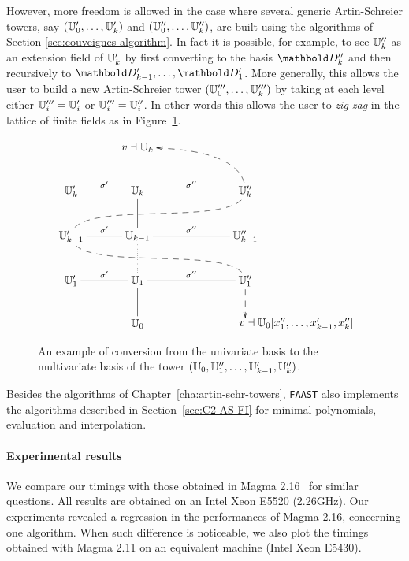   However, more freedom is allowed in the case where
several generic Artin-Schreier towers, say $(\mathbb{U}_0',\ldots,\mathbb{U}_k')$ and
$(\mathbb{U}_0'',\ldots,\mathbb{U}_k'')$, are built using the algorithms of Section
\ref{sec:couveignes-algorithm}. In fact it is possible, for example,
to see $\mathbb{U}_k''$ as an extension field of $\mathbb{U}'_k$ by first converting
to the basis $\basis{D}''_k$ and then recursively to
$\basis{D}'_{k-1},\ldots,\basis{D}'_1$. More generally, this allows
the user to build a new Artin-Schreier tower
$(\mathbb{U}_0''',\ldots,\mathbb{U}_k''')$ by taking at each level either
$\mathbb{U}_i'''=\mathbb{U}_i'$ or $\mathbb{U}_i'''=\mathbb{U}_i''$.  In other words this allows the
user to \emph{zig-zag} in the lattice of finite fields as in
Figure~\ref{fig:lattice}.

\begin{figure}
  \centering
  \begin{equation*}
    \xymatrix@C=1cm{
      & v\wrt\U_k \ar@{<--}@(r,u)[dr] \\
      \U_k'\ar@{-}[r]^{\sigma'} & \U_k\ar@{-}[d] & \U_k''\ar@{-}[l]_{\sigma''} \ar@{--}@(d,u)[dll]\\
      \U_{k-1}'\ar@{-}[r]^{\sigma'} \ar@{--}@(d,u)[drr] & \U_{k-1}\ar@{.}[d] & \U_{k-1}''\ar@{-}[l]_{\sigma''}\\
      \U_1'\ar@{-}[r]^{\sigma'} & \U_1\ar@{-}[d] & \U_1''\ar@{-}[l]_{\sigma''}\ar@{-->}[d]\\
      & \U_0 & *[r]{v\wrt\U_0[x_1'',\ldots,x_{k-1}',x_k'']}
    }
  \end{equation*}
  \caption{An example of conversion from the univariate basis to the
    multivariate basis of the tower $(\mathbb{U}_0,\mathbb{U}_1'',\ldots,\mathbb{U}_{k-1}',\mathbb{U}_k'')$.}
  \label{fig:lattice}
\end{figure}

Besides the algorithms of Chapter~\ref{cha:artin-schr-towers},
\texttt{FAAST} also implements the algorithms described in
Section~\ref{sec:C2-AS-FI} for minimal polynomials, evaluation and
interpolation.

\paragraph{Experimental results} We compare our timings with those
obtained in Mag\-ma 2.16~\cite{MAGMA} for similar questions.  All
results are obtained on an Intel Xeon E5520 (2.26GHz). Our experiments
revealed a regression in the performances of Magma 2.16, concerning
one algorithm. When such difference is noticeable, we also plot the
timings obtained with Magma 2.11 on an equivalent machine (Intel Xeon
E5430).



